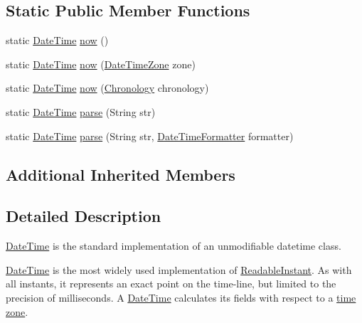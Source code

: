 \subsection*{Static Public Member Functions}
\begin{DoxyCompactItemize}
\item 
static \hyperlink{classorg_1_1joda_1_1time_1_1_date_time}{Date\-Time} \hyperlink{classorg_1_1joda_1_1time_1_1_date_time_a4c5ebc9293ad34982028bac53df0d238}{now} ()
\item 
static \hyperlink{classorg_1_1joda_1_1time_1_1_date_time}{Date\-Time} \hyperlink{classorg_1_1joda_1_1time_1_1_date_time_acd60c04eed2c8e7b5f98e2fbe976b818}{now} (\hyperlink{classorg_1_1joda_1_1time_1_1_date_time_zone}{Date\-Time\-Zone} zone)
\item 
static \hyperlink{classorg_1_1joda_1_1time_1_1_date_time}{Date\-Time} \hyperlink{classorg_1_1joda_1_1time_1_1_date_time_af8aad4f909c155907e622e037adf0d36}{now} (\hyperlink{classorg_1_1joda_1_1time_1_1_chronology}{Chronology} chronology)
\item 
static \hyperlink{classorg_1_1joda_1_1time_1_1_date_time}{Date\-Time} \hyperlink{classorg_1_1joda_1_1time_1_1_date_time_a12be18b86f51385fa9587a4f9f356a53}{parse} (String str)
\item 
static \hyperlink{classorg_1_1joda_1_1time_1_1_date_time}{Date\-Time} \hyperlink{classorg_1_1joda_1_1time_1_1_date_time_af8f7d70c2fee2a8099ee0147e840f8f2}{parse} (String str, \hyperlink{classorg_1_1joda_1_1time_1_1format_1_1_date_time_formatter}{Date\-Time\-Formatter} formatter)
\end{DoxyCompactItemize}
\subsection*{Additional Inherited Members}


\subsection{Detailed Description}
\hyperlink{classorg_1_1joda_1_1time_1_1_date_time}{Date\-Time} is the standard implementation of an unmodifiable datetime class. 

{\ttfamily \hyperlink{classorg_1_1joda_1_1time_1_1_date_time}{Date\-Time}} is the most widely used implementation of \hyperlink{interfaceorg_1_1joda_1_1time_1_1_readable_instant}{Readable\-Instant}. As with all instants, it represents an exact point on the time-\/line, but limited to the precision of milliseconds. A {\ttfamily \hyperlink{classorg_1_1joda_1_1time_1_1_date_time}{Date\-Time}} calculates its fields with respect to a \hyperlink{classorg_1_1joda_1_1time_1_1_date_time_zone}{time zone}. 

